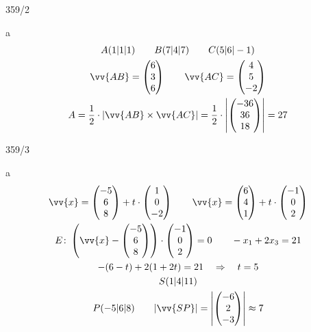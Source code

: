 \begin{exercise}{359/2}
  \item [a]
  \begin{gather*}
    A(1|1|1) \qquad B(7|4|7) \qquad C(5|6|-1) \\
    \vv{AB} = \begin{pmatrix}6 \\ 3 \\ 6\end{pmatrix} \qquad \vv{AC} = \begin{pmatrix}4 \\ 5 \\ -2\end{pmatrix} \\
    A = \frac{1}{2} \cdot |\vv{AB} \times \vv{AC}| = \frac{1}{2} \cdot \left|\begin{pmatrix}-36 \\ 36 \\ 18\end{pmatrix}\right| = 27
  \end{gather*}
\end{exercise}
\newpage
\begin{exercise}{359/3}
  \item [a]
  \begin{gather*}
    \vv{x} = \begin{pmatrix}-5 \\ 6 \\ 8\end{pmatrix} + t \cdot \begin{pmatrix}1 \\ 0 \\ -2\end{pmatrix} \qquad \vv{x} = \begin{pmatrix}6 \\ 4 \\ 1\end{pmatrix} + t \cdot \begin{pmatrix}-1 \\ 0 \\ 2\end{pmatrix} \\
    E \colon \left(\vv{x} - \begin{pmatrix}-5 \\ 6 \\ 8\end{pmatrix}\right) \cdot \begin{pmatrix}-1 \\ 0 \\ 2\end{pmatrix} = 0 \qquad -x_1 + 2x_3 = 21 \\
    -(6 - t) + 2(1 + 2t) = 21 \quad\Rightarrow\quad t = 5 \\
    S(1|4|11) \\
    P(-5|6|8) \qquad |\vv{SP}| = \left|\begin{pmatrix}-6 \\ 2 \\ -3\end{pmatrix}\right| \approx 7
  \end{gather*}
\end{exercise}
